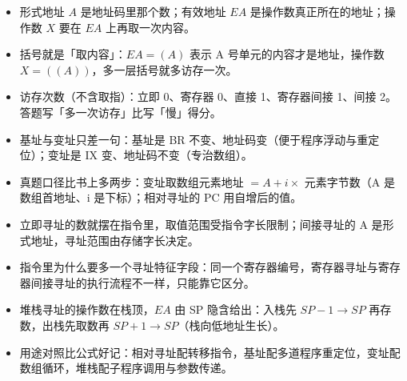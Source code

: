 \documentclass[10pt,a4paper]{ctexart}
\begin{document}
\begin{itemize}

\item 形式地址 $A$ 是地址码里那个数；有效地址 $EA$ 是操作数真正所在的地址；操作数 $X$ 要在 $EA$ 上再取一次内容。

\item 括号就是「取内容」：$EA=(A)$ 表示 A 号单元的内容才是地址，操作数 $X=((A))$，多一层括号就多访存一次。

\item 访存次数（不含取指）：立即 0、寄存器 0、直接 1、寄存器间接 1、间接 2。答题写「多一次访存」比写「慢」得分。

\item 基址与变址只差一句：基址是 BR 不变、地址码变（便于程序浮动与重定位）；变址是 IX 变、地址码不变（专治数组）。

\item 真题口径比书上多两步：变址取数组元素地址 $=A+i\times$ 元素字节数（A 是数组首地址、i 是下标）；相对寻址的 PC 用自增后的值。

\item 立即寻址的数就摆在指令里，取值范围受指令字长限制；间接寻址的 A 是形式地址，寻址范围由存储字长决定。

\item 指令里为什么要多一个寻址特征字段：同一个寄存器编号，寄存器寻址与寄存器间接寻址的执行流程不一样，只能靠它区分。

\item 堆栈寻址的操作数在栈顶，$EA$ 由 SP 隐含给出：入栈先 $SP-1\to SP$ 再存数，出栈先取数再 $SP+1\to SP$（栈向低地址生长）。

\item 用途对照比公式好记：相对寻址配转移指令，基址配多道程序重定位，变址配数组循环，堆栈配子程序调用与参数传递。

\end{itemize}
\end{document}
